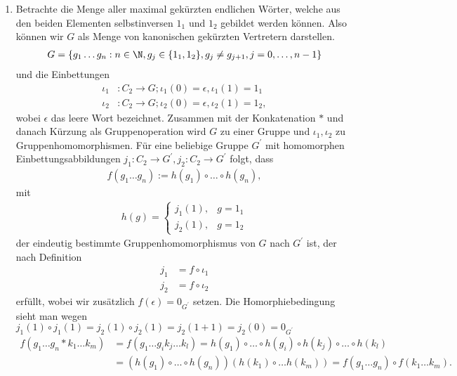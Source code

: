 \begin{solution}
\begin{enumerate}
  \item Betrachte die Menge aller maximal gekürzten endlichen Wörter, welche aus den beiden
  Elementen selbstinversen $1_1$ und $1_2$ gebildet werden können.
  Also können wir $G$ als Menge von kanonischen gekürzten Vertretern darstellen.
  \begin{align*}
  G = \{g_1\dots g_n: n \in \N, g_j \in\{1_1,1_2\}, g_j \neq g_{j+1}, j = 0,\dots,n-1\}
  \end{align*}
  und die Einbettungen
  \begin{align*}
    \iota_1&: C_2 \to G; \iota_1(0) = \epsilon, \iota_1(1) = 1_1 \\
    \iota_2&: C_2 \to G; \iota_2(0) = \epsilon, \iota_2(1) = 1_2,
  \end{align*}
  wobei $\epsilon$ das leere Wort bezeichnet.
  Zusammen mit der Konkatenation $*$ und danach Kürzung als Gruppenoperation wird $G$ zu einer Gruppe
  und $\iota_1,\iota_2$ zu Gruppenhomomorphismen.
  Für eine beliebige Gruppe $G^{\prime}$ mit homomorphen Einbettungsabbildungen $j_1: C_2 \to G^{\prime},
  j_2: C_2 \to G^{\prime}$ folgt, dass
  \begin{align*}
    f(g_1\dots g_n) := h(g_1)\circ\dots\circ h(g_n),
  \end{align*}
  mit
  \begin{align*}
    h(g) = \begin{cases}
      j_1(1), & g = 1_1 \\
      j_2(1), & g = 1_2
    \end{cases}
  \end{align*}
  der eindeutig bestimmte Gruppenhomomorphismus von $G$ nach $G^{\prime}$
  ist, der nach Definition
  \begin{align*}
    j_1 &= f \circ \iota_1 \\
    j_2 &= f \circ \iota_2
  \end{align*}
  erfüllt, wobei wir zusätzlich $f(\epsilon) = 0_{G^\prime}$ setzen.
  Die Homorphiebedingung sieht man wegen $j_1(1)\circ j_1(1) = j_2(1)\circ j_2(1) = j_2(1+1) = j_2(0) = 0_{G^{\prime}}$
  \begin{align*}
    f(g_1\dots g_n * k_1\dots k_m) &= f(g_1\dots g_ik_j\dots k_l)
    =h(g_1)\circ\dots\circ h(g_i)\circ h(k_j) \circ \dots \circ h(k_l) \\
    &= (h(g_1)\circ\dots\circ h(g_n))(h(k_1)\circ \dots h(k_m))
    = f(g_1\dots g_n) \circ f(k_1\dots k_m).
  \end{align*}

\end{enumerate}
\end{solution}
